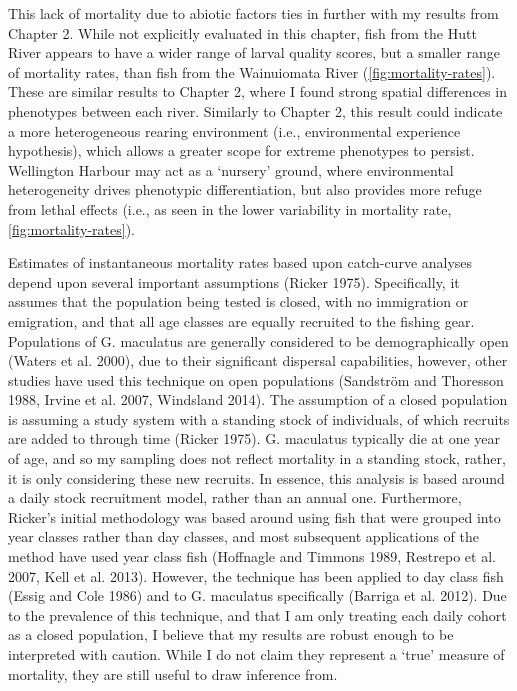 \documentclass[]{book}
\begin{document}
This lack of mortality due to abiotic factors ties in further with my
results from Chapter 2. While not explicitly evaluated in this chapter,
fish from the Hutt River appears to have a wider range of larval quality
scores, but a smaller range of mortality rates, than fish from the
Wainuiomata River (\ref{fig:mortality-rates}). These are similar results
to Chapter 2, where I found strong spatial differences in phenotypes
between each river. Similarly to Chapter 2, this result could indicate a
more heterogeneous rearing environment (i.e., environmental experience
hypothesis), which allows a greater scope for extreme phenotypes to
persist. Wellington Harbour may act as a `nursery' ground, where
environmental heterogeneity drives phenotypic differentiation, but also
provides more refuge from lethal effects (i.e., as seen in the lower
variability in mortality rate, \ref{fig:mortality-rates}).

Estimates of instantaneous mortality rates based upon catch-curve
analyses depend upon several important assumptions (Ricker 1975).
Specifically, it assumes that the population being tested is closed,
with no immigration or emigration, and that all age classes are equally
recruited to the fishing gear. Populations of G. maculatus are generally
considered to be demographically open (Waters et al. 2000), due to their
significant dispersal capabilities, however, other studies have used
this technique on open populations (Sandström and Thoresson 1988, Irvine
et al. 2007, Windsland 2014). The assumption of a closed population is
assuming a study system with a standing stock of individuals, of which
recruits are added to through time (Ricker 1975). G. maculatus typically
die at one year of age, and so my sampling does not reflect mortality in
a standing stock, rather, it is only considering these new recruits. In
essence, this analysis is based around a daily stock recruitment model,
rather than an annual one. Furthermore, Ricker's initial methodology was
based around using fish that were grouped into year classes rather than
day classes, and most subsequent applications of the method have used
year class fish (Hoffnagle and Timmons 1989, Restrepo et al. 2007, Kell
et al. 2013). However, the technique has been applied to day class fish
(Essig and Cole 1986) and to G. maculatus specifically (Barriga et al.
2012). Due to the prevalence of this technique, and that I am only
treating each daily cohort as a closed population, I believe that my
results are robust enough to be interpreted with caution. While I do not
claim they represent a `true' measure of mortality, they are still
useful to draw inference from.
\end{document}
